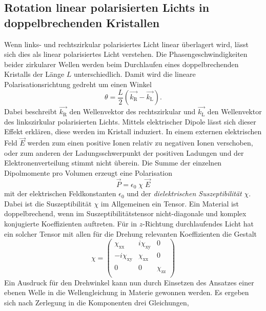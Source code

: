 \documentclass[
  bibliography=totoc,     %
  captions=tableheading,  %
  titlepage=firstiscover, %
]{scrartcl}
\begin{document}
\subsection{Rotation linear polarisierten Lichts in doppelbrechenden Kristallen}
\label{sec:Theo1}
Wenn links- und rechtszirkular polarisiertes Licht linear überlagert wird,
lässt sich dies als linear polarisiertes Licht verstehen.
Die Phasengeschwindigkeiten beider zirkularer Wellen werden beim Durchlaufen
eines doppelbrechenden Kristalls der Länge $L$ unterschiedlich. Damit wird
die lineare Polarisationsrichtung gedreht um einen Winkel
\begin{equation}
  \theta = \frac{L}{2} \left(\vec{k_\text{R}} - \vec{k_\text{L}}\right) .
  \label{eqn:Winkel-2}
\end{equation}
Dabei beschreibt $\vec{k_\text{R}}$ den Wellenvektor des rechtszirkular und
$\vec{k_\text{L}}$ den Wellenvektor des linkszirkular polarisierten Lichts.
Mittels elektrischer Dipole lässt sich dieser Effekt erklären, diese werden
im Kristall induziert.
In einem externen elektrischen Feld $\vec{E}$ werden zum einen positive Ionen relativ
zu negativen Ionen verschoben, oder zum anderen der Ladungsschwerpunkt der
positiven Ladungen und der Elektronenverteilung stimmt nicht überein.
Die Summe der einzelnen Dipolmomente pro Volumen erzeugt eine Polarisation
\begin{equation}
  \vec{P} = \epsilon_0 \; \chi \; \vec{E}
  \label{eqn:Polarisation}
\end{equation}
mit der elektrischen Feldkonstanten $\epsilon_0$ und der
\emph{dielektrischen Suszeptibilität} $\chi$.
Dabei ist die Suszeptibilität $\chi$ im Allgemeinen ein Tensor.
Ein Material ist doppelbrechend, wenn im Suszeptibilitätstensor
nicht-diagonale und komplex konjugierte Koeffizienten auftreten.
Für in $z$-Richtung durchlaufendes Licht hat ein solcher Tensor
mit allen für die Drehung relevanten Koeffizienten die Gestalt
\begin{equation*}
  \chi =
  \begin{pmatrix}
    \chi_\text{xx} & i \chi_\text{xy} & 0 \\
    -i \chi_\text{xy} & \chi_\text{xx} & 0 \\
    0 & 0 & \chi_\text{zz} \\
  \end{pmatrix}
\end{equation*}
Ein Ausdruck für den Drehwinkel kann nun durch Einsetzen des Ansatzes
einer ebenen Welle in die Wellengleichung in Materie gewonnen werden.
Es ergeben sich nach Zerlegung in die Komponenten drei Gleichungen,
\end{document}
